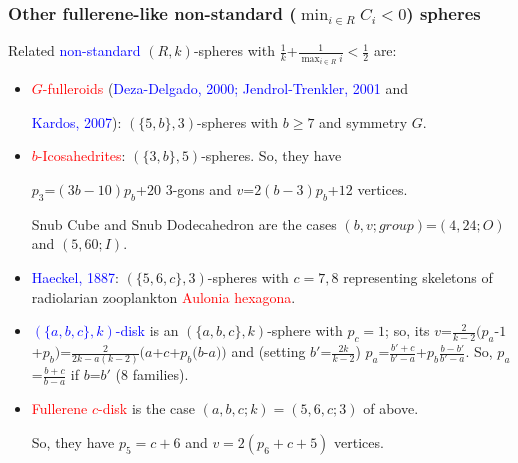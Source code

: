 \documentclass{beamer}
\begin{document}
\begin{frame}\frametitle{Other fullerene-like non-standard ($\min_{i\in 
R}C_i$$<$$0$)  
 spheres}

Related  \textcolor{blue}{non-standard}  $(R,k)$-spheres 
 with
$\frac{1}{k}$+$\frac{1}{\max_{i\in R}i}$$<$$\frac{1}{2}$ are:
\begin{itemize}
\item \textcolor{red}{$G$-fulleroids} (\textcolor{blue}{Deza-Delgado,
2000; Jendrol-Trenkler, 2001} and

\textcolor{blue}{Kardos, 2007}): $(\{5,b\},3)$-spheres
with $b$$\ge$$ 7$ and symmetry $G$.

\item \textcolor{red}{$b$-Icosahedrites}: $(\{3,b\},5)$-spheres. 
So, they have
  
$p_3$=$(3b-10)p_b$+$20$ $3$-gons and  $v$=$2(b-3)p_b$+$12$ vertices.

Snub Cube and Snub Dodecahedron are the cases $(b,v;group)$=$(4,24;O)$  
and  $(5,60;I)$.

\item \textcolor{blue}{Haeckel, 1887}: $(\{5,6,c\},3)$-spheres
 with $c=7,8$ representing
skeletons of  radiolarian zooplankton \textcolor{red}{Aulonia hexagona}.


\item 
\textcolor{blue}{$(\{a,b,c\},k)$-disk} is an   $(\{a,b,c\},k)$-sphere with $p_c=1$;
so, its
$v$=$\frac{2}{k-2}(p_a$-$1$+$p_b)$=$\frac{2}{2k-a(k-2)}(a$+$c$+$p_b(b$-$a))$ 
and (setting $b'$=$\frac{2k}{k-2}$) 
 $p_a$=$\frac{b'+c}{b'-a}$+$p_b\frac{b-b'}{b'-a}$. 
So, $p_a$=$\frac{b+c}{b-a}$ if $b$=$b'$ ($8$ families). 

\item \textcolor{red}{Fullerene $c$-disk} is  the case 
$(a,b,c;k)=(5,6,c;3)$ of above.
 
So, they have $p_5=c+6$  and $v=2(p_6+c+5)$ vertices.



\end{itemize}
\end{frame}
\end{document}

